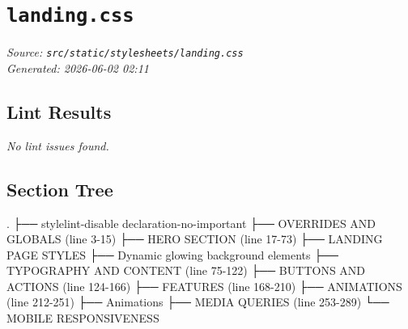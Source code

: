 
\section{\texttt{landing.css}}
\textit{Source: \texttt{src/static/stylesheets/landing.css}} \\
\textit{Generated: 2026-06-02 02:11} \\

\subsection{Lint Results}
\textit{No lint issues found.} \\

\subsection{Section Tree}
\begingroup
\linespread{0.9}\selectfont
\begin{verbnobox}[\FiraCode]
.
├── stylelint-disable declaration-no-important
├── OVERRIDES AND GLOBALS  (line 3-15)
├── HERO SECTION  (line 17-73)
├── LANDING PAGE STYLES
├── Dynamic glowing background elements
├── TYPOGRAPHY AND CONTENT  (line 75-122)
├── BUTTONS AND ACTIONS  (line 124-166)
├── FEATURES  (line 168-210)
├── ANIMATIONS  (line 212-251)
├── Animations
├── MEDIA QUERIES  (line 253-289)
└── MOBILE RESPONSIVENESS
\end{verbnobox}
\endgroup
